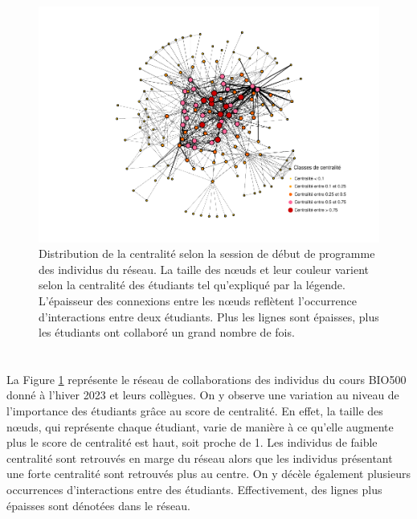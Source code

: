 \documentclass[preprint, 3p,
authoryear]{elsarticle} %
\begin{document}
\begin{figure}
\centering
\includegraphics{rapport_files/figure-latex/unnamed-chunk-1-1.pdf}
\caption{\label{fig:plot1}Distribution de la centralité selon la session
de début de programme des individus du réseau. La taille des nœuds et
leur couleur varient selon la centralité des étudiants tel qu'expliqué
par la légende. L'épaisseur des connexions entre les nœuds reflètent
l'occurrence d'interactions entre deux étudiants. Plus les lignes sont
épaisses, plus les étudiants ont collaboré un grand nombre de fois.}
\end{figure}

\hypertarget{section-1}{%
\section{}\label{section-1}}

La Figure \ref{fig:plot1} représente le réseau de collaborations des
individus du cours BIO500 donné à l'hiver 2023 et leurs collègues. On y
observe une variation au niveau de l'importance des étudiants grâce au
score de centralité. En effet, la taille des nœuds, qui représente
chaque étudiant, varie de manière à ce qu'elle augmente plus le score de
centralité est haut, soit proche de 1. Les individus de faible
centralité sont retrouvés en marge du réseau alors que les individus
présentant une forte centralité sont retrouvés plus au centre. On y
décèle également plusieurs occurrences d'interactions entre des
étudiants. Effectivement, des lignes plus épaisses sont dénotées dans le
réseau.

\hypertarget{section-2}{%
\section{}\label{section-2}}
\end{document}
